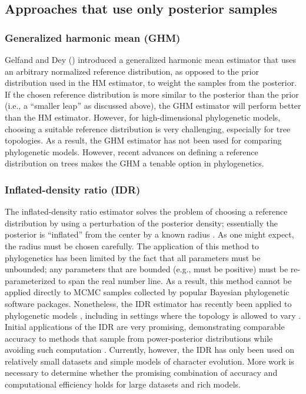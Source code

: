 \subsection{Approaches that use only posterior samples}

\subsubsection{Generalized harmonic mean (GHM)}
Gelfand and Dey (\citeyear{Gelfand1994}) introduced a generalized harmonic mean
estimator that uses an arbitrary normalized reference distribution, as
opposed to the prior distribution used in the HM estimator, to weight the
samples from the posterior.
If the chosen reference distribution is more similar to the posterior than the
prior (i.e., a ``smaller leap'' as discussed above), the GHM estimator will
perform better than the HM estimator.
However, for high-dimensional phylogenetic models, choosing a suitable
reference distribution is very challenging, especially for tree topologies.
As a result, the GHM estimator has not been used for comparing phylogenetic
models.
However, recent advances on defining a reference distribution on trees
\citep{Holder2014} makes the GHM a tenable option in phylogenetics.

\subsubsection{Inflated-density ratio (IDR)}
The inflated-density ratio estimator solves the problem of choosing a
reference distribution by using a perturbation of the posterior density;
essentially the posterior is ``inflated'' from the center by a known radius
\citep{Petris2007,Arima2012,Arima2014}.
As one might expect, the radius must be chosen carefully.
The application of this method to phylogenetics has been limited by the fact
that all parameters must be unbounded; any parameters that are bounded (e.g.,
must be positive) must be re-parameterized to span the real number line.
As a result, this method cannot be applied directly to MCMC samples collected
by popular Bayesian phylogenetic software packages.
Nonetheless, the IDR estimator has recently been applied to phylogenetic models
\citep{Arima2014}, including in settings where the topology is allowed to vary
\citep{Wu2014}.
Initial applications of the IDR are very promising, demonstrating comparable
accuracy to methods that sample from power-posterior distributions while
avoiding such computation \citep{Arima2014,Wu2014}.
Currently, however, the IDR has only been used on relatively small datasets and
simple models of character evolution.
More work is necessary to determine whether the promising combination of
accuracy and computational efficiency holds for large datasets and rich models.


